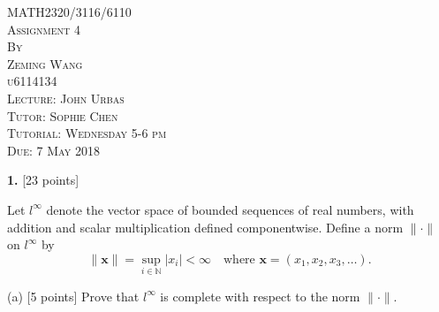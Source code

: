 \documentclass[11pt,a4paper]{amsart}
\def\N{{\mathbb N}}
\begin{document}
\thispagestyle{empty}
\begin{center}
\huge
\vspace*{1.0in} MATH2320/3116/6110
\\\vspace{0.5in} \textsc{Assignment 4}
\normalsize
\\\vspace{0.5in} \textsc{By}
\\\vspace{0.1in} \textsc{Zeming Wang}
\\\vspace{0.1in} \textsc{u6114134}
\normalsize
\\\vspace{0.5in} \textsc{Lecture: John Urbas}
\\\vspace{0.1in} \textsc{Tutor: Sophie Chen}
\\\vspace{0.1in} \textsc{Tutorial: Wednesday 5-6 pm}
\normalsize
\\\vspace{0.5in} \textsc{Due: 7 May 2018}
\end{center}

\newpage
\setcounter{page}{1}

%
%
%
%
%
%
%
%
%
%
%







{\bf 1.} [23 points]

Let $l^\infty$ denote the vector space of bounded sequences of real numbers, with addition and scalar multiplication defined componentwise.
Define a norm $\|\cdot\|$ on $l^\infty$ by
$$\|{\bm x}\|=\sup_{i\in\N}|x_i| <\infty
\quad\mbox{where ${\bm x}=(x_1,x_2,x_3,\dots)$}. $$

(a) [5 points] Prove that $l^\infty$ is complete with respect to the norm $\|\cdot\|$.
\end{document}
